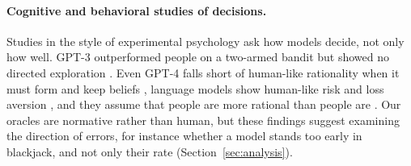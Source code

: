 \paragraph{Cognitive and behavioral studies of decisions.}
Studies in the style of experimental psychology ask how models decide, not only how well. GPT-3 outperformed people on a two-armed bandit but showed no directed exploration \citep{binz2023cognitive}. Even GPT-4 falls short of human-like rationality when it must form and keep beliefs \citep{fan2024rational}, language models show human-like risk and loss aversion \citep{jia2024decision}, and they assume that people are more rational than people are \citep{liu2025rational}. Our oracles are normative rather than human, but these findings suggest examining the direction of errors, for instance whether a model stands too early in blackjack, and not only their rate (Section~\ref{sec:analysis}).

